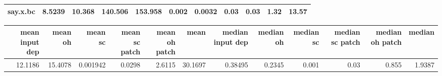 \begin{tabular}{lrrrrrrrrrr}
 say.x.bc             &          8.5239 &         10.368  & 140.506  & 153.958  &   0.002  &   0.0032 &           0.03 &           0.03 &           1.32 &          13.57 \\
\hline
\end{tabular}\begin{tabular}{rrrrrrrrrrrr}
\hline
   mean input dep &   mean oh &   mean sc &   mean sc patch &   mean oh patch &    mean &   median input dep &   median oh &   median sc &   median sc patch &   median oh patch &   median \\
\hline
          12.1186 &   15.4078 &  0.001942 &          0.0298 &          2.6115 & 30.1697 &            0.38495 &      0.2345 &       0.001 &              0.03 &             0.855 &   1.9387 \\
\hline
\end{tabular}